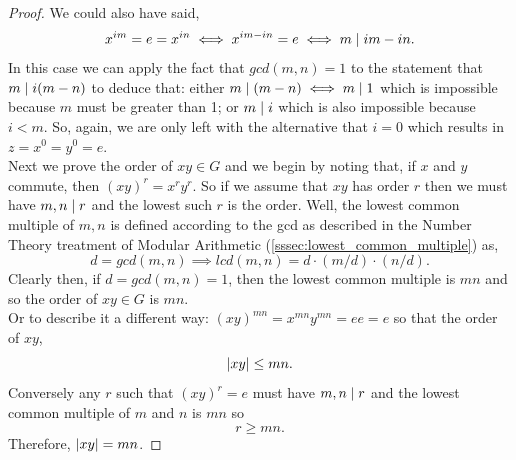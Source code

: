 \documentclass[MathsNotesBase.tex]{subfiles}
\begin{document}
{\begin{proof}
			We could also have said,
			\[ x^{im} = e = x^{in} \iff x^{im - in} = e \iff m \mid im - in. \]
			In this case we can apply the fact that ${ gcd(m,n) = 1 }$ to the statement that ${ m \mid i(m-n) }$ to deduce that: either ${  m \mid (m-n) \iff m \mid 1 }$ which is impossible because $m$ must be greater than 1; or ${ m \mid i }$ which is also impossible because ${ i < m }$. So, again, we are only left with the alternative that ${ i = 0 }$ which results in ${ z = x^0 = y^0 = e }$.\\
			
			Next we prove the order of ${ xy \in G }$ and we begin by noting that, if $x$ and $y$ commute, then ${ (xy)^r = x^ry^r }$. So if we assume that $xy$ has order $r$ then we must have ${ m,n \mid r }$ and the lowest such $r$ is the order. Well, the lowest common multiple of ${ m,n }$ is defined according to the gcd as described in the Number Theory treatment of Modular Arithmetic (\ref{sssec:lowest_common_multiple}) as,
			\[ d = gcd(m,n) \implies lcd(m,n) = d \cdot (m/d) \cdot (n/d). \]
			Clearly then, if ${ d = gcd(m,n) = 1 }$, then the lowest common multiple is ${ mn }$ and so the order of ${ xy \in G }$ is ${ mn }$.\\
			
			Or to describe it a different way: ${ (xy)^{mn} = x^{mn}y^{mn} = ee = e }$ so that the order of $xy$,
			\[ \left\lvert xy\right\rvert \leq mn. \]
			Conversely any $r$ such that ${ (xy)^r = e }$ must have ${ m,n \mid r }$ and the lowest common multiple of $m$ and $n$ is $mn$ so
			\[ r \geq mn. \]
			Therefore, ${ \left\lvert xy\right\rvert = mn }$.			
		\end{proof}
	
		\bigskip
}
\end{document}
